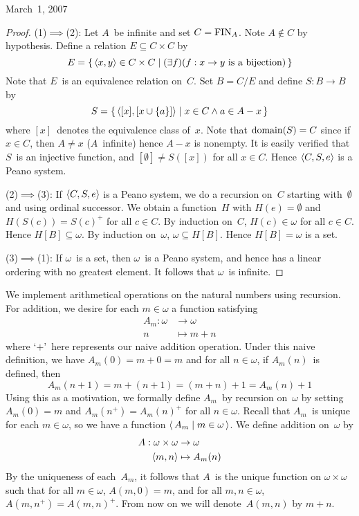 \begin{lecture}{March~1, 2007}
\begin{proof}
(1)\(\implies\)(2): Let \(A\)~be infinite and set \(C=\operatorname{FIN}_A\). Note \(A\not\in C\) by hypothesis. Define a relation \(E\subseteq C\times C\) by
\[E=\{\,\langle{x},{y}\rangle\in C\times C\mid (\exists f)(f:x\to y\text{ is a bijection})\,\}\]
Note that \(E\)~is an equivalence relation on~\(C\). Set \(B=C/E\) and define \(S:B\to B\) by
\[S=\{\,\langle{[x]},{[x\cup\{a\}]}\rangle\mid x\in C\land a\in A-x\,\}\]
where \([x]\)~denotes the equivalence class of~\(x\). Note that \(\operatorname{domain}(S)=C\) since if \(x\in C\), then \(A\ne x\) (\(A\)~infinite) hence \(A-x\) is nonempty. It is easily verified that \(S\)~is an injective function, and \([\emptyset]\ne S([x])\) for all \(x\in C\). Hence \(\langle{C},{{S},{e}}\rangle\) is a Peano system.

(2)\(\implies\)(3): If \(\langle{C},{{S},{e}}\rangle\) is a Peano system, we do a recursion on~\(C\) starting with~\(\emptyset\) and using ordinal successor. We obtain a function~\(H\) with \(H(e)=\emptyset\) and \(H(S(c))=S(c)^+\) for all \(c\in C\). By induction on~\(C\), \(H(c)\in\omega\) for all \(c\in C\). Hence \(H[B]\subseteq\omega\). By induction on~\(\omega\), \(\omega\subseteq H[B]\). Hence \(H[B]=\omega\) is a set.

(3)\(\implies\)(1): If \(\omega\)~is a set, then \(\omega\)~is a Peano system, and hence has a linear ordering with no greatest element. It follows that \(\omega\)~is infinite.
\end{proof}

We implement arithmetical operations on the natural numbers using recursion. For addition, we desire for each \(m\in\omega\) a function satisfying
\begin{align*}
A_m:\omega&\to\omega\\
		n&\mapsto m+n
\end{align*}
\noindent where `\(+\)'~here represents our naive addition operation. Under this naive definition, we have \(A_m(0)=m+0=m\) and for all \(n\in\omega\), if \(A_m(n)\)~is defined, then
\[A_m(n+1)=m+(n+1)=(m+n)+1=A_m(n)+1\]
Using this as a motivation, we formally define \(A_m\)~by recursion on~\(\omega\) by setting \(A_m(0)=m\) and \(A_m(n^+)=A_m(n)^+\) for all \(n\in\omega\). Recall that \(A_m\)~is unique for each \(m\in\omega\), so we have a function \(\langle\,{A_m}\mid{m\in\omega}\,\rangle\). We define addition on~\(\omega\) by
\begin{align*}
A:\omega\times\omega&\to\omega\\
	\langle{m},{n}\rangle&\mapsto A_m(n)
\end{align*}
By the uniqueness of each~\(A_m\), it follows that \(A\)~is the unique function on \(\omega\times\omega\) such that for all \(m\in\omega\), \(A(m,0)=m\), and for all \(m,n\in\omega\), \(A(m,n^+)=A(m,n)^+\). From now on we will denote~\(A(m,n)\) by \(m+n\).


\end{lecture}
